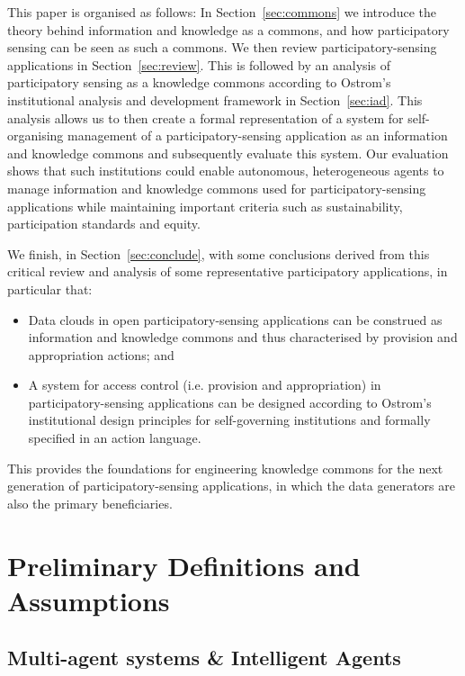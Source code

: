 This paper is organised as follows: In Section~\ref{sec:commons} we introduce the theory behind information and knowledge as a commons, and how participatory sensing can be seen as such a commons. 
We then review participatory-sensing applications in Section~\ref{sec:review}. This is followed by an analysis of participatory sensing as a knowledge commons according to Ostrom's institutional analysis and development framework in Section~\ref{sec:iad}. 
This analysis allows us to then create a formal representation of a system for self-organising management of a participatory-sensing application as an information and knowledge commons and subsequently evaluate this system. 
Our evaluation shows that such institutions could enable autonomous, heterogeneous agents to manage information and knowledge commons used for participatory-sensing applications while maintaining important criteria such as sustainability, participation standards and equity.

We finish, in Section~\ref{sec:conclude}, with some conclusions derived from this critical review and analysis of
some representative participatory applications,
in particular that:
\begin{itemize}
\item Data clouds in open participatory-sensing applications can be construed as information and knowledge commons and thus characterised by provision and appropriation actions; and
\item A system for access control (i.e. provision and appropriation) in participatory-sensing applications can be designed according to Ostrom's institutional design principles for self-governing institutions and formally specified in an action language.
\end{itemize}

This provides the foundations for engineering knowledge commons for the next generation
of participatory-sensing applications, in which the data generators are also the primary beneficiaries.

\section{Preliminary Definitions and Assumptions}

\subsection{Multi-agent systems \& Intelligent Agents}\label{sec:agents}

